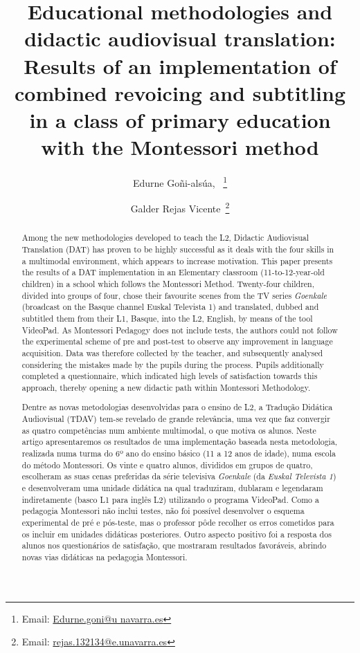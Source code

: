\documentclass[english]{textolivre}
\title{Educational methodologies and didactic audiovisual translation: Results of an implementation of combined revoicing and subtitling in a class of primary education with the Montessori method}
\author[1]{Edurne Goñi-alsúa, ~\orcid{0000-0002-7488-2689}\thanks{Email: \href{Edurne.goni@unavarra.es}{Edurne.goni@u navarra.es}}}\affil[1]{Universidad Pública de Navarra, Pamplona, Spain.}
\author[1]{Galder Rejas Vicente~\orcid{0009-0007-4495-100X}\thanks{Email: \href{rejas.132134@e.unavarra.es}{rejas.132134@e.unavarra.es}}}
\begin{document}
\maketitle
\begin{polyabstract}
\begin{english}
  \begin{abstract}
      Among the new methodologies developed to teach the L2, Didactic Audiovisual Translation (DAT) has proven to be highly successful as it deals with the four skills in a multimodal environment, which appears to increase motivation. This paper presents the results of a DAT implementation in an Elementary classroom (11-to-12-year-old children) in a school which follows the Montessori Method. Twenty-four children, divided into groups of four, chose their favourite scenes from the TV series \emph{Goenkale} (broadcast on the Basque channel Euskal Televista 1) and translated, dubbed and subtitled them from their L1, Basque, into the L2, English, by means of the tool VideoPad. As Montessori Pedagogy does not include tests, the authors could not follow the experimental scheme of pre and post-test to observe any improvement in language acquisition. Data was therefore collected by the teacher, and subsequently analysed considering the mistakes made by the pupils during the process.  Pupils additionally completed a questionnaire, which indicated high levels of satisfaction towards this approach, thereby opening a new didactic path within Montessori Methodology. 

  \end{abstract}
\end{english}

\begin{portuguese}
\begin{abstract}
    Dentre as novas metodologias desenvolvidas para o ensino de L2, a Tradução Didática Audiovisual (TDAV) tem-se revelado de grande relevância, uma vez que faz convergir as quatro competências num ambiente multimodal, o que motiva os alunos. Neste artigo apresentaremos os resultados de uma implementação baseada nesta metodologia, realizada numa turma do 6º ano do ensino básico (11 a 12 anos de idade), numa escola do método Montessori. Os vinte e quatro alunos, divididos em grupos de quatro, escolheram as suas cenas preferidas da série televisiva \emph{Goenkale} (da \emph{Euskal Televista 1}) e desenvolveram uma unidade didática na qual traduziram, dublaram e legendaram indiretamente (basco L1 para inglês L2) utilizando o programa VideoPad. Como a pedagogia Montessori não inclui testes, não foi possível desenvolver o esquema experimental de pré e pós-teste, mas o professor pôde recolher os erros cometidos para os incluir em unidades didáticas posteriores. Outro aspecto positivo foi a resposta dos alunos nos questionários de satisfação, que mostraram resultados favoráveis, abrindo novas vias didáticas na pedagogia Montessori.  


\end{abstract}
\end{portuguese}
\end{polyabstract}
\end{document}
